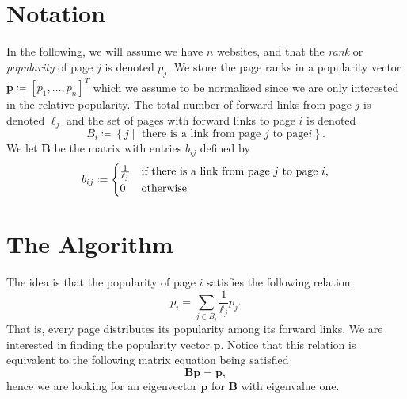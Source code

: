 \documentclass[12pt, oneside, article, a4paper]{memoir}
\newcommand{\mat}[1]{\bm{#1}}
\begin{document}
\section{Notation}

In the following, we will assume we have \( n \) websites, and that the
\emph{rank} or \emph{popularity} of page \( j \) is denoted \( p_j \).  We
store the page ranks in a popularity vector \( \mat{p} \coloneqq [p_1, \ldots,
p_n]^T \) which we assume to be normalized since we are only interested in the
relative popularity. The total number of forward links from page \( j \) is
denoted \( \ell_j \) and the set of pages with forward links to page \( i \) is
denoted
\begin{equation}
B_i \coloneqq \left\{j \mid \text{ there is a link from page } j \text{ to page
} i \right\}.
\end{equation}
We let \( \mat{B} \) be the matrix with entries \(b_{ij} \) defined by
\begin{equation}
    b_{ij} \coloneqq \begin{cases}
        \frac{1}{\ell_j} & \text{if there is a link from page \( j \) to page \( i \)}, \\
        0 & \text{otherwise}
    \end{cases}
\end{equation}

\section{The Algorithm}

The idea is that the popularity of page \( i \) satisfies the following
relation:
\begin{equation}
    p_i = \sum_{j \in B_i} \frac{1}{\ell_j} p_j.
\end{equation}
That is, every page distributes its popularity among its forward links. We are
interested in finding the popularity vector \( \mat{p} \). Notice that this
relation is equivalent to the following matrix equation being satisfied
\begin{equation}
    \mat{B}\mat{p} = \mat{p},
\end{equation}
hence we are looking for an eigenvector \( \mat{p} \) for \( \mat{B} \) with
eigenvalue one.
\end{document}
